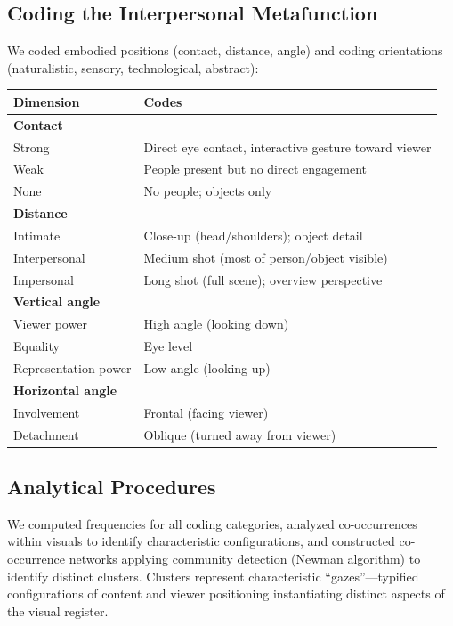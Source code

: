 \documentclass[../main.tex]{subfiles}
\begin{document}
\subsection{Coding the Interpersonal Metafunction}

We coded embodied positions (contact, distance, angle) and coding orientations (naturalistic, sensory, technological, abstract):

\begin{center}
\small
\begin{tabular}{lp{8cm}}
\toprule
\textbf{Dimension} & \textbf{Codes} \\
\midrule
\textbf{Contact} & \\
\quad Strong & Direct eye contact, interactive gesture toward viewer \\
\quad Weak & People present but no direct engagement \\
\quad None & No people; objects only \\
\midrule
\textbf{Distance} & \\
\quad Intimate & Close-up (head/shoulders); object detail \\
\quad Interpersonal & Medium shot (most of person/object visible) \\
\quad Impersonal & Long shot (full scene); overview perspective \\
\midrule
\textbf{Vertical angle} & \\
\quad Viewer power & High angle (looking down) \\
\quad Equality & Eye level \\
\quad Representation power & Low angle (looking up) \\
\midrule
\textbf{Horizontal angle} & \\
\quad Involvement & Frontal (facing viewer) \\
\quad Detachment & Oblique (turned away from viewer) \\
\bottomrule
\end{tabular}
\end{center}

\subsection{Analytical Procedures}

We computed frequencies for all coding categories, analyzed co-occurrences within visuals to identify characteristic configurations, and constructed co-occurrence networks applying community detection (Newman algorithm) to identify distinct clusters. Clusters represent characteristic ``gazes''---typified configurations of content and viewer positioning instantiating distinct aspects of the visual register.
\end{document}
